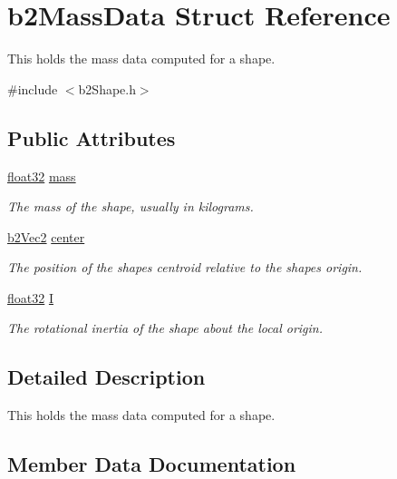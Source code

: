 \hypertarget{structb2_mass_data}{}\section{b2\+Mass\+Data Struct Reference}
\label{structb2_mass_data}


This holds the mass data computed for a shape.  




{\ttfamily \#include $<$b2\+Shape.\+h$>$}

\subsection*{Public Attributes}
\begin{DoxyCompactItemize}
\item 
\mbox{\hyperlink{b2_settings_8h_aacdc525d6f7bddb3ae95d5c311bd06a1}{float32}} \mbox{\hyperlink{structb2_mass_data_aea85d9595a38d2eed05b8d2ea80d97b1}{mass}}
\begin{DoxyCompactList}\small\item\em The mass of the shape, usually in kilograms. \end{DoxyCompactList}\item 
\mbox{\hyperlink{structb2_vec2}{b2\+Vec2}} \mbox{\hyperlink{structb2_mass_data_a1d59bebc7030c4dded0c2febc57ebdd7}{center}}
\begin{DoxyCompactList}\small\item\em The position of the shape\textquotesingle{}s centroid relative to the shape\textquotesingle{}s origin. \end{DoxyCompactList}\item 
\mbox{\hyperlink{b2_settings_8h_aacdc525d6f7bddb3ae95d5c311bd06a1}{float32}} \mbox{\hyperlink{structb2_mass_data_ad2d06e96e2d79d895df16ae0e5fe0376}{I}}
\begin{DoxyCompactList}\small\item\em The rotational inertia of the shape about the local origin. \end{DoxyCompactList}\end{DoxyCompactItemize}


\subsection{Detailed Description}
This holds the mass data computed for a shape. 

\subsection{Member Data Documentation}
\mbox{\label{structb2_mass_data_a1d59bebc7030c4dded0c2febc57ebdd7}} 
